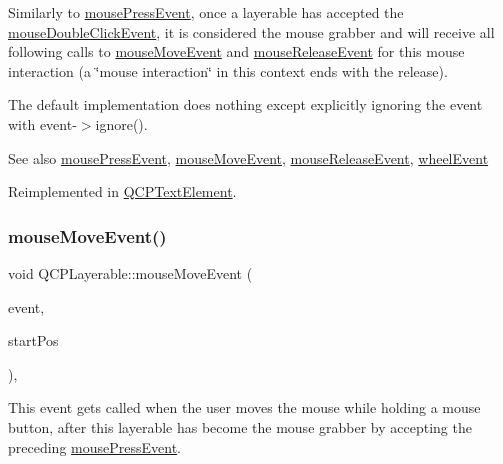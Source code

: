 Similarly to \hyperlink{class_q_c_p_layerable_af6567604818db90f4fd52822f8bc8376}{mouse\+Press\+Event}, once a layerable has accepted the \hyperlink{class_q_c_p_layerable_a4171e2e823aca242dd0279f00ed2de81}{mouse\+Double\+Click\+Event}, it is considered the mouse grabber and will receive all following calls to \hyperlink{class_q_c_p_layerable_a9eee1ba47fd69be111059ca3881933e4}{mouse\+Move\+Event} and \hyperlink{class_q_c_p_layerable_aa0d79b005686f668622bbe66ac03ba2c}{mouse\+Release\+Event} for this mouse interaction (a \char`\"{}mouse interaction\char`\"{} in this context ends with the release).

The default implementation does nothing except explicitly ignoring the event with {\ttfamily event-\/$>$ignore()}.

\begin{DoxySeeAlso}{See also}
\hyperlink{class_q_c_p_layerable_af6567604818db90f4fd52822f8bc8376}{mouse\+Press\+Event}, \hyperlink{class_q_c_p_layerable_a9eee1ba47fd69be111059ca3881933e4}{mouse\+Move\+Event}, \hyperlink{class_q_c_p_layerable_aa0d79b005686f668622bbe66ac03ba2c}{mouse\+Release\+Event}, \hyperlink{class_q_c_p_layerable_a47dfd7b8fd99c08ca54e09c362b6f022}{wheel\+Event} 
\end{DoxySeeAlso}


Reimplemented in \hyperlink{class_q_c_p_text_element_a2272ff775ab385f612e9fd39773de7c0}{Q\+C\+P\+Text\+Element}.

\mbox{\label{class_q_c_p_layerable_a9eee1ba47fd69be111059ca3881933e4}} 
\subsubsection{\texorpdfstring{mouse\+Move\+Event()}{mouseMoveEvent()}}
{\footnotesize\ttfamily void Q\+C\+P\+Layerable\+::mouse\+Move\+Event (\begin{DoxyParamCaption}\item[{Q\+Mouse\+Event $\ast$}]{event,  }\item[{const Q\+PointF \&}]{start\+Pos }\end{DoxyParamCaption})\hspace{0.3cm}{\ttfamily [protected]}, {\ttfamily [virtual]}}

This event gets called when the user moves the mouse while holding a mouse button, after this layerable has become the mouse grabber by accepting the preceding \hyperlink{class_q_c_p_layerable_af6567604818db90f4fd52822f8bc8376}{mouse\+Press\+Event}.

